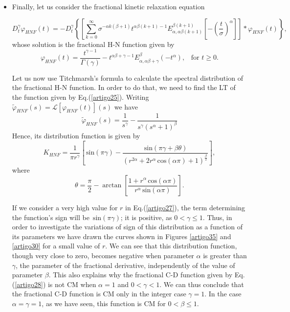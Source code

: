 \documentclass[12pt]{amsart}
\numberwithin{equation}{section}
\renewcommand{\sin}{\hspace{2pt}\textrm{sin}}
\renewcommand{\cos}{\hspace{2pt}\textrm{cos}}
\begin{document}
\begin{itemize}
\item Finally, let us consider the fractional kinetic relaxation equation 

\begin{equation}
D^{\gamma}_{t}\varphi_{HNF}(t)=-
	D^{\gamma}_{t}\left\{\left[\sum_{k=0}^{\infty}\sigma^{-\alpha
	k(\beta+1)}t^{\alpha\beta(k+1)-1}
	E_{\alpha,\alpha\beta(k+1)}^{\beta(k+1)}
	\left[-\left(\frac{t}{\sigma}\right)^{\alpha}\right]\right]
	\ast\varphi_{HNF}(t)\right\},
\label{hnf1}
\end{equation}
whose solution is the fractional H-N function given by 
\begin{equation}
\varphi_{HNF}(t)= \frac{t^{\gamma-1}}{\Gamma(\gamma)}
	-t^{\alpha\beta+\gamma-1}E_{\alpha,\alpha\beta+\gamma}^{\beta}
	(-t^\alpha),\,\,\,\,\,\mbox{for}\,\,t\geq0.
\label{artigo25}
\end{equation}

Let us now use Titchmarsh's formula to calculate the spectral distribution
of the fractional H-N function.  In order to do that, we need to find the
LT of the function given by Eq.(\ref{artigo25}). Writing
$\tilde{\varphi}_{HNF}(s) =\mathscr{L} [ \varphi_{HNF}(t)](s)$ we have 
\begin{equation}
\tilde{\varphi}_{HNF}(s)=\frac{1}{s^{\gamma}}-
	\frac{1}{s^{\gamma}(s^{\alpha}+1)^{\beta}}
\end{equation}
Hence, its distribution function is given by 
\begin{equation}
K_{HNF}=\frac{1}{\pi r^{\gamma}} \left[\sin(\pi \gamma)-
	\frac{\sin(\pi \gamma +\beta \theta)}{(r^{2\alpha}+2r^{\alpha}\cos(\alpha \pi)+1)^{\frac{\beta}{2}}}\right],
\label{artigo27}
\end{equation}
where  
\begin{equation}
\theta= \frac{\pi}{2}-\arctan\left[\frac{1+r^{\alpha}\cos(\alpha \pi)}{r^{\alpha}\sin(\alpha \pi)}\right].
\end{equation}

If we consider a very high value for $r$ in Eq.(\ref{artigo27}), the term
determining the function's sign will be $\sin (\pi \gamma)$; it is
positive, as $0<\gamma\leq1$. Thus, in order to investigate the variations
of sign of this distribution as a function of its parameters we have drawn
the curves shown in Figures \ref{artigo35} and \ref{artigo30} for a small
value of $r$.  We can see that this distribution function, though very
close to zero, becomes negative when parameter $\alpha$ is greater than
$\gamma$, the parameter of the fractional derivative, independently of the
value of parameter $\beta$. This also explains why the fractional C-D
function given by Eq.(\ref{artigo28}) is not CM when $\alpha=1$ and $0 <
\gamma <1$. We can thus conclude that the fractional C-D function is CM
only in the integer case $\gamma=1$. In the case $\alpha = \gamma =1$, as
we have seen, this function is CM for $0 < \beta \leq 1$.


\end{itemize}
\end{document}
